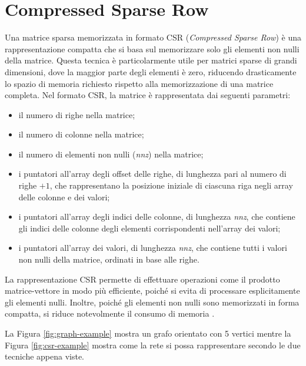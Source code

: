     \section{Compressed Sparse Row}
    
        Una matrice sparsa memorizzata in formato CSR (\textit{Compressed Sparse Row}) è una rappresentazione compatta che si basa sul memorizzare solo gli elementi non nulli della matrice. Questa tecnica è particolarmente utile per matrici sparse di grandi dimensioni, dove la maggior parte degli elementi è zero, riducendo drasticamente lo spazio di memoria richiesto rispetto alla memorizzazione di una matrice completa. Nel formato CSR, la matrice è rappresentata dai seguenti parametri:
    
        \begin{itemize}
            \item il numero di righe nella matrice;
            \item il numero di colonne nella matrice;
            \item il numero di elementi non nulli (\textit{nnz}) nella matrice;
            \item i puntatori all'array degli offset delle righe, di lunghezza pari al numero di righe $+ 1$, che rappresentano la posizione iniziale di ciascuna riga negli array delle colonne e dei valori;
            \item i puntatori all'array degli indici delle colonne, di lunghezza \textit{nnz}, che contiene gli indici delle colonne degli elementi corrispondenti nell'array dei valori;
            \item i puntatori all'array dei valori, di lunghezza \textit{nnz}, che contiene tutti i valori non nulli della matrice, ordinati in base alle righe.
        \end{itemize}

        La rappresentazione CSR permette di effettuare operazioni come il prodotto matrice-vettore in modo più efficiente, poiché si evita di processare esplicitamente gli elementi nulli. Inoltre, poiché gli elementi non nulli sono memorizzati in forma compatta, si riduce notevolmente il consumo di memoria \cite{NvidiaWebsite}.
        
        La Figura \ref{fig:graph-example} mostra un grafo orientato con 5 vertici mentre la Figura \ref{fig:csr-example} mostra come la rete si possa rappresentare secondo le due tecniche appena viste.
        
